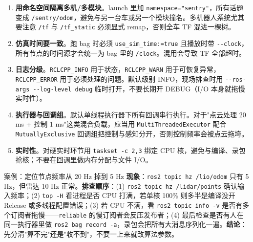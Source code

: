 \begin{enumerate}
  \item \textbf{用命名空间隔离多机/多模块}。launch 里加 \lstinline{namespace="sentry"}，所有话题变成 \lstinline{/sentry/odom}，避免与另一台车或另一个模块撞名。多机器人系统尤其要注意 \lstinline{/tf} 与 \lstinline{/tf_static} 必须显式 remap，否则全车 TF 混进一棵树。
  \item \textbf{仿真时间要一致}。跑 bag 时必须 \lstinline{use_sim_time:=true} 且播放时带 \lstinline{--clock}，所有节点的时间源才会统一为 bag 里的 \lstinline{/clock}。混用会导致 TF 全部超时。
  \item \textbf{日志分级}。\lstinline{RCLCPP_INFO} 用于状态，\lstinline{RCLCPP_WARN} 用于可恢复异常，\lstinline{RCLCPP_ERROR} 用于必须处理的问题。默认级别 INFO，现场排查时用 \lstinline{--ros-args --log-level debug} 临时打开，不要长期开 DEBUG（I/O 本身就拖慢实时性）。
  \item \textbf{执行器与回调组}。默认单线程执行器下所有回调串行执行。对于"点云处理 20 ms + 控制 1 ms"这类混合负载，应当用 \lstinline{MultiThreadedExecutor} 配合 \lstinline{MutuallyExclusive} 回调组把控制与感知分开，否则控制频率会被点云拖垮。
  \item \textbf{实时性}。对硬实时环节用 \lstinline{taskset -c 2,3} 绑定 CPU 核，避免与编译、录包抢核；不要在回调里做内存分配与文件 I/O。
\end{enumerate}

\begin{keybox}{案例：定位节点频率从 20 Hz 掉到 5 Hz}
\textbf{现象}：\lstinline{ros2 topic hz /lio/odom} 只有 5 Hz，但雷达 10 Hz 正常。\textbf{排查顺序}：(1) \lstinline{ros2 topic hz /lidar/points} 确认输入频率；(2) \lstinline{top -H} 看进程是否 CPU 打满，若单核 100\% 则多半是编译没开 Release 或多线程配置错误；(3) 若 CPU 不满，看 \lstinline{ros2 topic info -v} 是否有多个订阅者拖慢——\lstinline{reliable} 的慢订阅者会反压发布者；(4) 最后检查是否有人在同一执行器里做 \lstinline{ros2 bag record -a}，录包会把所有大消息序列化一遍。\textbf{结论}：先分清"算不完"还是"收不到"，不要一上来就改算法参数。
\end{keybox}

